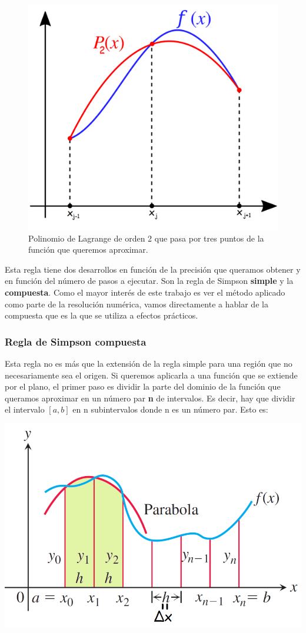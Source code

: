 \documentclass[12pt]{article}
\begin{document}
\begin{figure}[H]
\centering
\includegraphics[scale=0.26]{intro}
\caption{Polinomio de Lagrange de orden 2 que pasa por tres puntos de la función que queremos aproximar.}
\end{figure}

Esta regla tiene dos desarrollos en función de la precisión que queramos obtener y en función del número de pasos a ejecutar. Son la regla de Simpson \textbf{simple} y la \textbf{compuesta}. Como el mayor interés de este trabajo es ver el método aplicado como parte de la resolución numérica, vamos directamente a hablar de la compuesta que es la que se utiliza a efectos prácticos.

\subsubsection{Regla de Simpson compuesta}

Esta regla no es más que la extensión de la regla simple para una región que no necesariamente sea el origen. Si queremos aplicarla a una función que se extiende por el plano, el primer paso es dividir la parte del dominio de la función que queramos aproximar en un número par \textbf{n} de intervalos. Es decir, hay que dividir el intervalo $[a,b]$ en n subintervalos donde n es un número par. Esto es:

\begin{center}
\includegraphics[width=0.6\linewidth]{simple_n}
\end{center}
\end{document}
